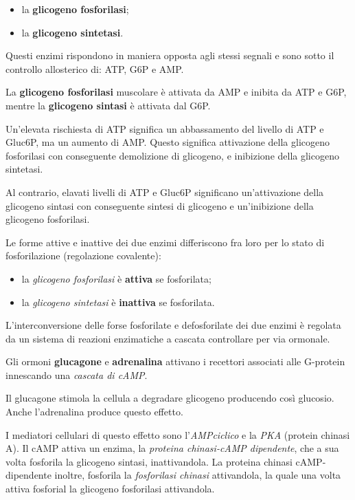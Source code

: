 \documentclass[]{article}
\begin{document}
\begin{itemize}
\itemsep1pt\parskip0pt
\item
  la \textbf{glicogeno fosforilasi};
\item
  la \textbf{glicogeno sintetasi}.
\end{itemize}

Questi enzimi rispondono in maniera opposta agli stessi segnali e sono
sotto il controllo allosterico di: ATP, G6P e AMP.

La \textbf{glicogeno fosforilasi} muscolare è attivata da AMP e inibita
da ATP e G6P, mentre la \textbf{glicogeno sintasi} è attivata dal G6P.

Un'elevata rischiesta di ATP significa un abbassamento del livello di
ATP e Gluc6P, ma un aumento di AMP. Questo significa attivazione della
glicogeno fosforilasi con conseguente demolizione di glicogeno, e
inibizione della glicogeno sintetasi.

Al contrario, elavati livelli di ATP e Gluc6P significano un'attivazione
della glicogeno sintasi con conseguente sintesi di glicogeno e
un'inibizione della glicogeno fosforilasi.

Le forme attive e inattive dei due enzimi differiscono fra loro per lo
stato di fosforilazione (regolazione covalente):

\begin{itemize}
\itemsep1pt\parskip0pt
\item
  la \emph{glicogeno fosforilasi} è \textbf{attiva} se fosforilata;
\item
  la \emph{glicogeno sintetasi} è \textbf{inattiva} se fosforilata.
\end{itemize}

L'interconversione delle forse fosforilate e defosforilate dei due
enzimi è regolata da un sistema di reazioni enzimatiche a cascata
controllare per via ormonale.

Gli ormoni \textbf{glucagone} e \textbf{adrenalina} attivano i recettori
associati alle G-protein innescando una \emph{cascata di cAMP}.

Il glucagone stimola la cellula a degradare glicogeno producendo così
glucosio. Anche l'adrenalina produce questo effetto.

I mediatori cellulari di questo effetto sono l'\emph{AMPciclico} e la
\emph{PKA} (protein chinasi A). Il cAMP attiva un enzima, la
\emph{proteina chinasi-cAMP dipendente}, che a sua volta fosforila la
glicogeno sintasi, inattivandola. La proteina chinasi cAMP-dipendente
inoltre, fosforila la \emph{fosforilasi chinasi} attivandola, la quale
una volta attiva fosforial la glicogeno fosforilasi attivandola.
\end{document}
